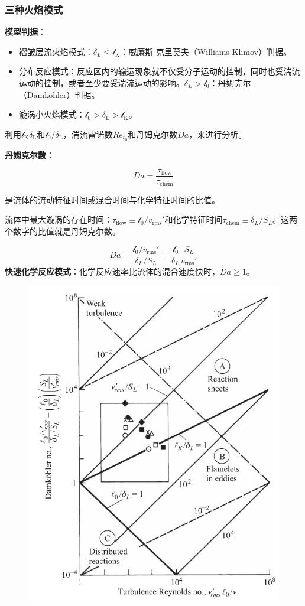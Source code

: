\subsubsection{三种火焰模式}

\textbf{模型判据}：

\begin{itemize}
    \item 褶皱层流火焰模式：\(\delta_L\le \mathcal{l}_\mathrm{K}\)：威廉斯-克里莫夫（Williams-Klimov）判据。
    \item 分布反应模式：反应区内的输运现象就不仅受分子运动的控制，同时也受湍流运动的控制，或者至少要受湍流运动的影响。\(\delta_L > \mathcal{l}_0\)：丹姆克尔（Damköhler）判据。
    \item 漩涡小火焰模式：\(\mathcal{l}_0 > \delta_\mathrm{L} > \mathcal{l}_\mathrm{K}\)。
\end{itemize}

利用\(\mathcal{l}_\mathrm{K}\delta_\mathrm{L}\)和\(\mathcal{l}_0/\delta_\mathrm{L}\)，湍流雷诺数\(Re_{t_0}\)和丹姆克尔数\(Da\)，来进行分析。

\textbf{丹姆克尔数}：

\begin{equation}
    Da = \frac{\tau_\mathrm{flow}}{\tau_\mathrm{chem}}
\end{equation}

是流体的流动特征时间或混合时间与化学特征时间的比值。

流体中最大漩涡的存在时间：\(\tau_\mathrm{flow}\equiv \mathcal{l}_0/v_\mathrm{rms}'\)和化学特征时间\(\tau_\mathrm{chem}\equiv \delta_L/S_L\)。这两个数字的比值就是丹姆克尔数。

\begin{equation}
    Da = \frac{\mathcal{l}_0/v_\mathrm{rms}'}{\delta_L / S_L} = \frac{\mathcal{l}_0}{\delta_L} \frac{S_L}{v_\mathrm{rms}'}
\end{equation}
\textbf{快速化学反应模式}：化学反应速率比流体的混合速度快时，\(Da\ge 1\)。

\begin{figure}[H]
    \includegraphics[width=.3\textwidth]{img/turb_premixed_type.png}
\end{figure}

